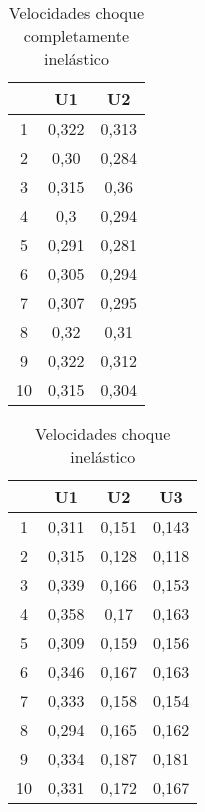 \documentclass[a4paper]{article}
\begin{document}
\begin{table}[H]
    \centering
    \begin{tabular}{|c|c|c|}
    \hline
        ~ & U1 & U2  \\ \hline
        1 & 0,322 & 0,313  \\ \hline
        2 & 0,30 & 0,284  \\ \hline
        3 & 0,315 & 0,36  \\ \hline
        4 & 0,3 & 0,294  \\ \hline
        5 & 0,291 & 0,281  \\ \hline
        6 & 0,305 & 0,294  \\ \hline
        7 & 0,307 & 0,295  \\ \hline
        8 & 0,32 & 0,31  \\ \hline
        9 & 0,322 & 0,312  \\ \hline
        10 & 0,315 & 0,304  \\ \hline
    \end{tabular}
    \caption{Velocidades choque completamente inelástico}
\end{table}

\begin{table}[H]
    \centering
    \begin{tabular}{|c|c|c|c|}
    \hline
        ~ & U1 & U2 & U3  \\ \hline
        1 & 0,311 & 0,151 & 0,143  \\ \hline
        2 & 0,315 & 0,128 & 0,118  \\ \hline
        3 & 0,339 & 0,166 & 0,153  \\ \hline
        4 & 0,358 & 0,17 & 0,163  \\ \hline
        5 & 0,309 & 0,159 & 0,156  \\ \hline
        6 & 0,346 & 0,167 & 0,163  \\ \hline
        7 & 0,333 & 0,158 & 0,154  \\ \hline
        8 & 0,294 & 0,165 & 0,162  \\ \hline
        9 & 0,334 & 0,187 & 0,181  \\ \hline
        10 & 0,331 & 0,172 & 0,167  \\ \hline
    \end{tabular}
    \caption{Velocidades choque inelástico}
\end{table}
\end{document}
